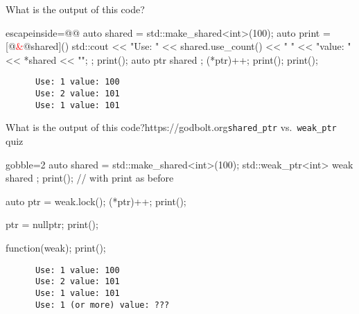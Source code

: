 \begin{frame}[fragile]
  \begin{exampleblock}{What is the output of this code?}
    \small
    \begin{cppcode*}{escapeinside=@@}
auto shared = std::make_shared<int>(100);
auto print = [@\textcolor{red}{&}@shared](){
  std::cout << "Use: " << shared.use_count() << " "
            << "value: " << *shared << "\n";
};
print();
{
  auto ptr{ shared };
  (*ptr)++;
  print();
}
print();
      \end{cppcode*}
  \end{exampleblock}
  \begin{block}{}
    \small
    \begin{verbatim}
      Use: 1 value: 100
      Use: 2 value: 101
      Use: 1 value: 101
    \end{verbatim}
  \end{block}
\end{frame}

\begin{advanced}

\begin{frame}[fragile]
  \begin{exampleblockGB}{What is the output of this code?}{https://godbolt.org}{\texttt{shared\_ptr} vs.\ \texttt{weak\_ptr} quiz}
    \small
    \begin{cppcode*}{gobble=2}
      auto shared = std::make_shared<int>(100);
      std::weak_ptr<int> weak{ shared };
      print(); // with print as before

      auto ptr = weak.lock();
      (*ptr)++;       print();

      ptr = nullptr;  print();

      function(weak); print();
    \end{cppcode*}
  \end{exampleblockGB}
  \pause
  \begin{block}{}
    \small
    \begin{verbatim}
      Use: 1 value: 100
      Use: 2 value: 101
      Use: 1 value: 101
      Use: 1 (or more) value: ???
    \end{verbatim}
  \end{block}
\end{frame}

\end{advanced}

